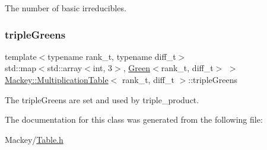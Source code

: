 The number of basic irreducibles. 

\mbox{\label{classMackey_1_1MultiplicationTable_af6b2afae20bd4a120e9792d1a9dce837}} 
\subsubsection{\texorpdfstring{triple\+Greens}{tripleGreens}}
{\footnotesize\ttfamily template$<$typename rank\+\_\+t, typename diff\+\_\+t$>$ \\
std\+::map$<$std\+::array$<$int, 3$>$, \hyperlink{classMackey_1_1Green}{Green}$<$rank\+\_\+t, diff\+\_\+t$>$ $>$ \hyperlink{classMackey_1_1MultiplicationTable}{Mackey\+::\+Multiplication\+Table}$<$ rank\+\_\+t, diff\+\_\+t $>$\+::triple\+Greens\hspace{0.3cm}{\ttfamily [protected]}}



The triple\+Greens are set and used by triple\+\_\+product. 



The documentation for this class was generated from the following file\+:\begin{DoxyCompactItemize}
\item 
Mackey/\hyperlink{Table_8h}{Table.\+h}\end{DoxyCompactItemize}
